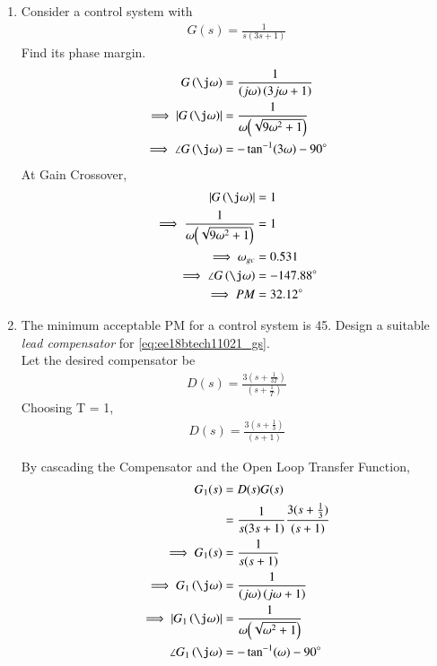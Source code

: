 \begin{enumerate}[label=\thesubsection.\arabic*.,ref=\thesubsection.\theenumi]


\item Consider a control system with 
%
\begin{align}
\label{eq:ee18btech11021_gs}
G(s) = \frac{1}{s(3s+1)}
\end{align}
%
Find its phase margin.
\\
\solution
\begin{align}
G\brak{\j\omega}&=\frac{1}{\brak{j\omega}\brak{3j\omega+1}} 
\\
\implies 
\abs{G\brak{\j\omega}}&=\frac{1}{{\omega}{\brak{\sqrt{9\omega^2+1}}}}
\\
\implies \angle G\brak{\j\omega}&=- \tan^{-1}(3\omega) - 90\degree
\end{align}
%
At Gain Crossover,
\begin{align}
\abs{G\brak{\j\omega}}&=1
\\
\implies \frac{1}{{\omega}{\brak{\sqrt{9\omega^2+1}}}} &=1
\\
\implies \omega_{gc} &= 0.531
\\
\implies \angle G\brak{\j\omega} &= -147.88\degree
\\
\implies PM &=32.12\degree
\end{align}
\item The minimum acceptable PM for a control system is 45\degree. Design a suitable {\em lead compensator} for \eqref{eq:ee18btech11021_gs}.
%
\\
\solution Let the desired compensator be
\begin{align}
D(s) = \frac{3(s+\frac{1}{3T})}{(s+\frac{1}{T})}
\end{align}
Choosing T = 1,
%
\begin{align}
D(s) = \frac{3(s+\frac{1}{3})}{(s+1)}
\end{align}

By cascading the Compensator and the Open Loop Transfer Function, 
\begin{align}
G_1(s) &= D(s)G(s) 
\\
&= \frac{1}{s(3s+1)} \frac{3(s+\frac{1}{3})}{(s+1)}
\\
\implies G_{1}(s) &= \frac{1}{s(s+1)}
\\
\implies G_{1}\brak{\j\omega}&=\frac{1}{\brak{j\omega}\brak{j\omega+1}} 
\\
\implies 
\abs{G_{1}\brak{\j\omega}}&=\frac{1}{{\omega}{\brak{\sqrt{\omega^2+1}}}}
\\
\angle G_{1}\brak{\j\omega}&=- \tan^{-1}(\omega) - 90\degree
\end{align}


\end{enumerate}
